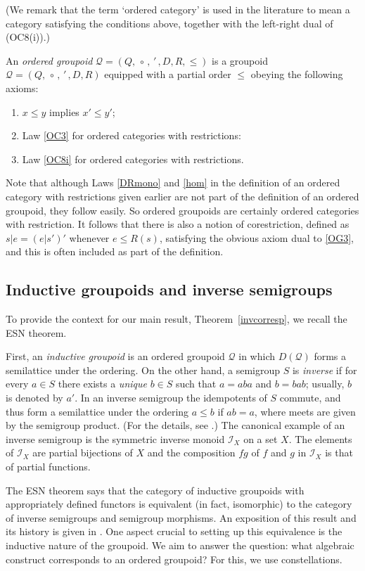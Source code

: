\documentclass[12pt]{amsart}
\theoremstyle{definition}
\newcommand{\ben}{\begin{enumerate}}
\newcommand{\een}{\end{enumerate}}
\newcommand{\Q}{\mathcal Q}
\begin{document}
(We remark that the term `ordered category' is used in the literature to mean a category satisfying the conditions above, together with the left-right dual of (OC8(i)).)

An {\em ordered groupoid} $\Q=(Q,\, \circ\, ,\, '\, ,D,R,\leq)$ is a groupoid $\Q=(Q,\, \circ\, ,\, '\, ,D,R)$ equipped with a partial order $\leq$ obeying the following axioms:

\ben[label=\textup{(OG\arabic*)}]
\item $x\leq y$ implies $x'\leq y'$;

\item Law \ref{OC3} for ordered categories with restrictions:  

\item Law \ref{OC8i} for ordered categories with restrictions.  \label{OG3}
\een
Note that although Laws \ref{DRmono} and \ref{hom} in the definition of an ordered category with restrictions given earlier are not part of the definition of an ordered groupoid, they follow easily.  So ordered groupoids are certainly ordered categories with restriction. It follows that there is also a notion of corestriction, defined as $s|e=(e|s')'$ whenever $e\leq R(s)$, satisfying the obvious axiom dual to \ref{OG3}, and this is often included as part of the definition. 


\subsection{Inductive groupoids and inverse semigroups} 

To provide the context for our main result, Theorem~\ref{invcorresp}, we recall the ESN theorem. 

First, an {\em inductive groupoid} is an ordered groupoid $\Q$ in which $D(\Q)$ forms a semilattice under the ordering. On the other hand, a  semigroup $S$ is {\em inverse} if for every $a\in S$ there exists a {\em unique} $b\in S$ such that $a=aba$ and $b=bab$; usually, 
$b$ is denoted by $a'$. In an inverse semigroup the idempotents of $S$ commute, and thus form a semilattice under the ordering
$a\leq b$ if $ab=a$, where meets are given by the semigroup product. (For the details, see \cite{lawsoninverse}.)  The canonical example of an inverse semigroup is the symmetric inverse monoid $\mathscr{I}_X$ on a set $X$. The elements 
of $\mathscr{I}_X$ are partial bijections of $X$ and the composition $fg$  of $f$ and $g$ in
$\mathscr{I}_X$ is that of  partial functions.

The ESN theorem says that the category of inductive groupoids with appropriately defined functors is equivalent (in fact, isomorphic) to the category of inverse semigroups and semigroup morphisms. An exposition of this result and its history is given in \cite{lawsoninverse}. One aspect crucial to setting up this equivalence is the inductive nature of the groupoid. We aim to answer the question: what algebraic construct corresponds to an ordered groupoid? For this, we use constellations.
\end{document}

